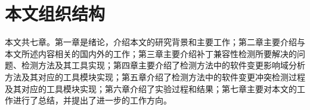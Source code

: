 
%		
%		

%
%
%
%
%


\section{本文组织结构}

本文共七章。第一章是绪论，介绍本文的研究背景和主要工作；第二章主要介绍与本文所述内容相关的国内外的工作；第三章主要介绍补丁兼容性检测所要解决的问题、检测方法及其工具实现；第四章主要介绍了检测方法中的软件变更影响域分析方法及其对应的工具模块实现；第五章介绍了检测方法中的软件变更冲突检测过程及其对应的工具模块实现；第六章介绍了实验过程和结果；第七章主要对本文的工作进行了总结，并提出了进一步的工作方向。


